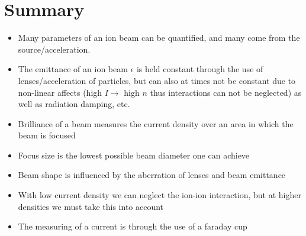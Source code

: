 \section{Summary}\label{sec:summary2}

\begin{itemize}
	\item Many parameters of an ion beam can be quantified, and many come from the source/acceleration.
	\item The emittance of an ion beam $\epsilon$ is held constant through the use of lenses/acceleration of particles, but can also at times not be constant due to non-linear affects (high $I \rightarrow$ high $n$ thus interactions can not be neglected) as well as radiation damping, etc.
	\item Brilliance of a beam measures the current density over an area in which the beam is focused
	\item Focus size is the lowest possible beam diameter one can achieve
	\item Beam shape is influenced by the aberration of lenses and beam emittance
	\item With low current density we can neglect the ion-ion interaction, but at higher densities we must take this into account
	\item  The measuring of a current is through the use of a faraday cup
\end{itemize}

